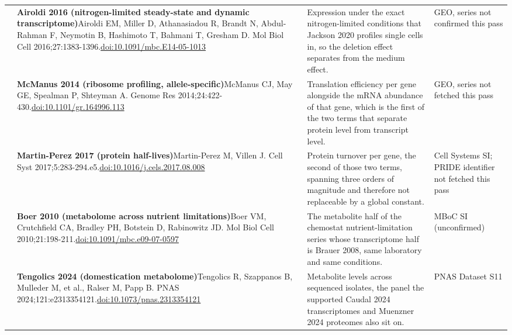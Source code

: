 \begin{landscape}
\begin{longtable}{@{}r@{\hspace{4pt}} L{86mm} L{92mm} L{62mm}@{}}
 & \textbf{Airoldi 2016 (nitrogen-limited steady-state and dynamic transcriptome)}\newline Airoldi EM, Miller D, Athanasiadou R, Brandt N, Abdul-Rahman F, Neymotin B, Hashimoto T, Bahmani T, Gresham D. Mol Biol Cell 2016;27:1383-1396.\newline \href{https://doi.org/10.1091/mbc.E14-05-1013}{doi:10.1091/\allowbreak mbc.E14-05-1013} & Expression under the exact nitrogen-limited conditions that Jackson 2020 profiles single cells in, so the deletion effect separates from the medium effect. & GEO, series not confirmed this pass \\
 & \textbf{McManus 2014 (ribosome profiling, allele-specific)}\newline McManus CJ, May GE, Spealman P, Shteyman A. Genome Res 2014;24:422-430.\newline \href{https://doi.org/10.1101/gr.164996.113}{doi:10.1101/\allowbreak gr.164996.113} & Translation efficiency per gene alongside the mRNA abundance of that gene, which is the first of the two terms that separate protein level from transcript level. & GEO, series not fetched this pass \\
 & \textbf{Martin-Perez 2017 (protein half-lives)}\newline Martin-Perez M, Villen J. Cell Syst 2017;5:283-294.e5.\newline \href{https://doi.org/10.1016/j.cels.2017.08.008}{doi:10.1016/\allowbreak j.cels.2017.08.008} & Protein turnover per gene, the second of those two terms, spanning three orders of magnitude and therefore not replaceable by a global constant. & Cell Systems SI; PRIDE identifier not fetched this pass \\
 & \textbf{Boer 2010 (metabolome across nutrient limitations)}\newline Boer VM, Crutchfield CA, Bradley PH, Botstein D, Rabinowitz JD. Mol Biol Cell 2010;21:198-211.\newline \href{https://doi.org/10.1091/mbc.e09-07-0597}{doi:10.1091/\allowbreak mbc.e09-07-0597} & The metabolite half of the chemostat nutrient-limitation series whose transcriptome half is Brauer 2008, same laboratory and same conditions. & MBoC SI (unconfirmed) \\
 & \textbf{Tengolics 2024 (domestication metabolome)}\newline Tengolics R, Szappanos B, Mulleder M, et al., Ralser M, Papp B. PNAS 2024;121:e2313354121.\newline \href{https://doi.org/10.1073/pnas.2313354121}{doi:10.1073/\allowbreak pnas.2313354121} & Metabolite levels across sequenced isolates, the panel the supported Caudal 2024 transcriptomes and Muenzner 2024 proteomes also sit on. & PNAS Dataset S11 \\

\end{longtable}
\end{landscape}
